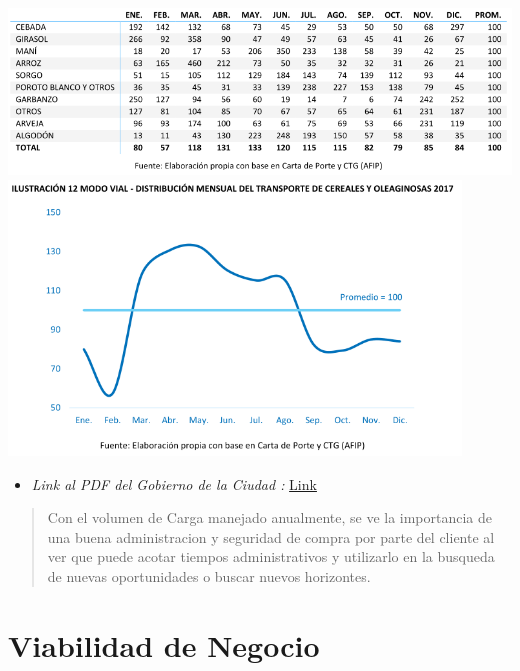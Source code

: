 \documentclass[
10pt, %
a4paper, %
oneside, %
headinclude,footinclude, %
BCOR5mm, %
]{scrartcl}
\begin{document}
 \begin{flushleft}
     \includegraphics[width=14cm, keepaspectratio]{images/annual_work_i.png}
     \includegraphics[width=12cm, keepaspectratio]{images/annual_work_ii.png}
 \end{flushleft}
  \begin{itemize}
    \item \textit{Link al PDF del Gobierno de la Ciudad :}
      \href{https://www.argentina.gob.ar/sites/default/files/transporte_terrestre_de_cereales_y_oleaginosas_2017_v1.pdf} {Link}
  \end{itemize}
  \begin{quotation}
    Con el volumen de Carga manejado anualmente, se ve la importancia de una
    buena administracion y seguridad de compra por parte del cliente al ver
    que puede acotar tiempos administrativos y utilizarlo en la busqueda de
    nuevas oportunidades o buscar nuevos horizontes.
  \end{quotation}

\section{Viabilidad de Negocio}
\end{document}
